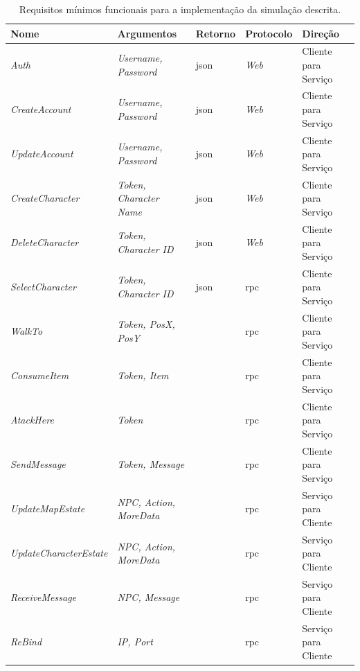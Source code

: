 \begin{table}[htb!]
\centering
\begin{adjustbox}{max width=\textwidth}
\caption{Requisitos mínimos funcionais para a implementação da simulação descrita.}
\label{tab:api_publica}
\begin{tabular}{l|l|l|l|l}
\hline \hline
Nome                  & Argumentos            & Retorno & Protocolo & Direção              \\ \hline \hline
\textit{Auth}                  & \textit{Username, Password}    & \ac{json} & \textit{Web}       & Cliente para Serviço \\ \hline
\textit{CreateAccount}         & \textit{Username, Password}    & \ac{json} & \textit{Web}       & Cliente para Serviço \\ \hline
\textit{UpdateAccount}         & \textit{Username, Password}    & \ac{json} & \textit{Web}       & Cliente para Serviço \\ \hline
\textit{CreateCharacter}       & \textit{Token, Character Name} & \ac{json} & \textit{Web}       & Cliente para Serviço \\ \hline
\textit{DeleteCharacter}       & \textit{Token, Character ID}   & \ac{json} & \textit{Web}       & Cliente para Serviço \\ \hline
\textit{SelectCharacter}       & \textit{Token, Character ID}   & \ac{json} & \ac{rpc}           & Cliente para Serviço \\ \hline
\textit{WalkTo}                & \textit{Token, PosX, PosY}     &           & \ac{rpc}           & Cliente para Serviço \\ \hline
\textit{ConsumeItem}           & \textit{Token, Item}           &           & \ac{rpc}           & Cliente para Serviço \\ \hline
\textit{AtackHere}             & \textit{Token}                 &           & \ac{rpc}           & Cliente para Serviço \\ \hline
\textit{SendMessage}           & \textit{Token, Message}        &           & \ac{rpc}           & Cliente para Serviço \\ \hline
\textit{UpdateMapEstate}       & \textit{NPC, Action, MoreData} &           & \ac{rpc}           & Serviço para Cliente \\ \hline
\textit{UpdateCharacterEstate} & \textit{NPC, Action, MoreData} &           & \ac{rpc}           & Serviço para Cliente \\ \hline
\textit{ReceiveMessage}        & \textit{NPC, Message}          &           & \ac{rpc}           & Serviço para Cliente \\ \hline
\textit{ReBind}                & \textit{IP, Port}              &           & \ac{rpc}           & Serviço para Cliente \\ \hline \hline
\end{tabular}
\end{adjustbox}
\end{table}

